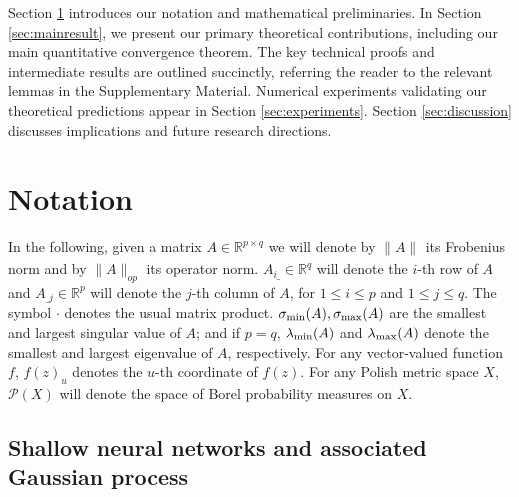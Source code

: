 \documentclass{article}
\theoremstyle{definition}
\theoremstyle{remark}
\numberwithin{equation}{section}
\newcommand{\R}{\mathbb{R}}
\newcommand{\lammax}{\lambda_{\textup{max}}}
\newcommand{\lammin}{\lambda_{\textup{min}}}
\newcommand{\norm}[2]{
    \|#1\|_{#2}
}
\begin{document}
Section \ref{sec:math-setting} introduces our notation and mathematical preliminaries. 
In Section \ref{sec:mainresult}, we present our primary theoretical contributions, including our main quantitative convergence theorem. 
The key technical proofs and intermediate results are outlined succinctly,
referring the reader to the relevant lemmas in the Supplementary Material. 
Numerical experiments validating our theoretical predictions appear in Section \ref{sec:experiments}. 
Section \ref{sec:discussion} discusses implications and future research directions.

\section{Notation}
\label{sec:math-setting}

In the following, given a matrix $A \in \R^{p \times q}$ we will denote by $\norm{A}{}$ its Frobenius norm and by $\norm{A}{op}$ its operator norm.
$A_{i\_} \in \R^q$ will denote the $i$-th row of $A$ and $A_{\_ j} \in \R^p$ will denote the $j$-th column of $A$, for $1 \le i \le p$ and $1 \le j \le q$.
The symbol $\cdot$ denotes the usual matrix product.
$\sigma_\textup{min}(A), \sigma_\textup{max}(A)$ are the smallest and largest singular value of $A$; and if $p=q$, $\lammin(A)$ and $\lammax(A)$ denote the smallest and largest eigenvalue of $A$, respectively.
For any vector-valued function $f$,
$f(z)_u$ denotes the $u$-th coordinate of $f(z)$.
For any Polish metric space $X$, $\mathcal P(X)$ will denote the space of Borel probability measures on $X$.

\subsection{Shallow neural networks and associated Gaussian process}
\label{subseq:notation}
\end{document}
